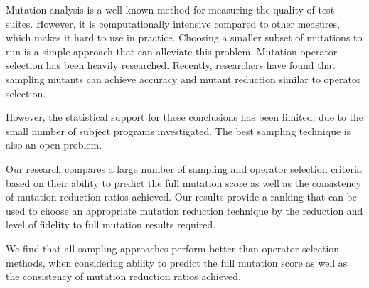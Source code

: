 Mutation analysis is a well-known method for measuring the quality of
test suites. However, it is computationally intensive compared to
other measures, which makes it hard to use in practice. Choosing a
smaller subset of mutations to run is a simple approach that can
alleviate this problem.  Mutation operator selection has been heavily
researched. Recently, researchers have found that sampling mutants can
achieve accuracy and mutant reduction similar to operator selection.

However, the statistical support for these conclusions has been limited, due to the small number of subject programs investigated.  The best sampling technique is also an open problem.


Our research compares a large number of sampling and operator
selection criteria based on their ability to predict the full mutation
score as well as the consistency of mutation reduction ratios
achieved. Our results provide a ranking that can be used to choose an
appropriate mutation reduction technique by the reduction and level of fidelity to full mutation results required.



We find that all sampling approaches perform better than operator
selection methods, when considering ability to predict the full
mutation score as well as the consistency of mutation reduction ratios
achieved.


